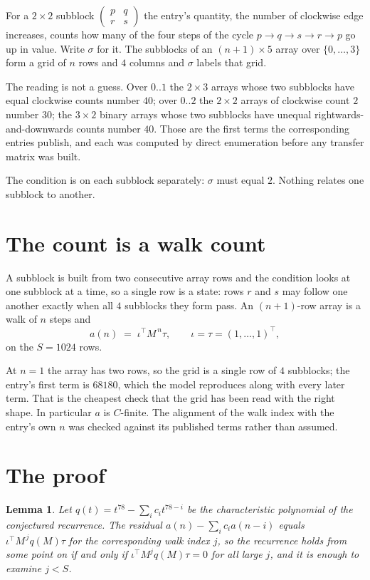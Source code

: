 \documentclass[11pt,a4paper]{article}
\theoremstyle{plain}
\newtheorem{lemma}[theorem]{Lemma}
\theoremstyle{definition}
\begin{document}
For a $2\times2$ subblock $\begin{pmatrix}p&q\\r&s\end{pmatrix}$ the
entry's quantity, the number of clockwise edge increases, counts how many of the four steps of the cycle $p\to q\to s\to r\to p$ go up in value. Write $\sigma$ for it. The subblocks of an
$(n+1)\times5$ array over $\{0,\dots,3\}$ form a grid of $n$ rows and $4$
columns and $\sigma$ labels that grid.

The reading is not a guess. Over $0..1$ the $2\times3$ arrays whose two subblocks have equal
clockwise counts number $40$; over $0..2$ the $2\times2$ arrays of clockwise count $2$ number
$30$; the $3\times2$ binary arrays whose two subblocks have unequal rightwards-and-downwards
counts number $40$. Those are the first terms the corresponding entries publish, and each was
computed by direct enumeration before any transfer matrix was built.

The condition is on each subblock separately: $\sigma$ must equal $2$. Nothing
relates one subblock to another.

\section{The count is a walk count}

A subblock is built from two consecutive array rows and the condition looks
at one subblock at a time, so a single row is a state: rows $r$ and $s$ may follow one another
exactly when all $4$ subblocks they form pass. An $(n+1)$-row array is a walk of $n$ steps and
\[
a(n)\;=\;\iota^{\!\top}M^{\,n}\tau,\qquad\iota=\tau=(1,\dots,1)^{\!\top},
\]
on the $S=1024$ rows.

At $n=1$ the array has two rows, so the grid is a single row of $4$
subblocks; the entry's first term is $68180$, which the model
reproduces along with every later term. That is the cheapest check that the grid has been read
with the right shape.
In particular $a$ is $C$-finite. The alignment of the walk index with the entry's own $n$ was
checked against its published terms rather than assumed.

\section{The proof}

\begin{lemma}\label{lem:crit}
Let $q(t)=t^{78}-\sum_i c_it^{78-i}$ be the characteristic polynomial of the
conjectured recurrence. The residual $a(n)-\sum_ic_ia(n-i)$ equals
$\iota^{\!\top}M^{\,j}q(M)\tau$ for the corresponding walk index $j$, so the recurrence
holds from some point on if and only if $\iota^{\!\top}M^{j}q(M)\tau=0$ for all large $j$,
and it is enough to examine $j<S$.
\end{lemma}
\end{document}
